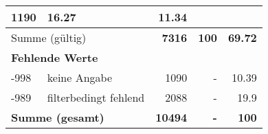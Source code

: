 \begin{longtable}{lXrrr}
       \num{1190} &
       \num[round-mode=places,round-precision=2]{16.27} &
         \num[round-mode=places,round-precision=2]{11.34} \\
     \midrule
     \multicolumn{2}{l}{Summe (gültig)} &
       \textbf{\num{7316}} &
     \textbf{\num{100}} &
       \textbf{\num[round-mode=places,round-precision=2]{69.72}} \\
     \multicolumn{5}{l}{\textbf{Fehlende Werte}}\\
       -998 &
       keine Angabe &
         \num{1090} &
        - &
         \num[round-mode=places,round-precision=2]{10.39} \\
       -989 &
       filterbedingt fehlend &
         \num{2088} &
        - &
         \num[round-mode=places,round-precision=2]{19.9} \\
     \midrule
     \multicolumn{2}{l}{\textbf{Summe (gesamt)}} &
          \textbf{\num{10494}} &
        \textbf{-} &
        \textbf{\num{100}} \\
     \bottomrule
     \end{longtable}
     

